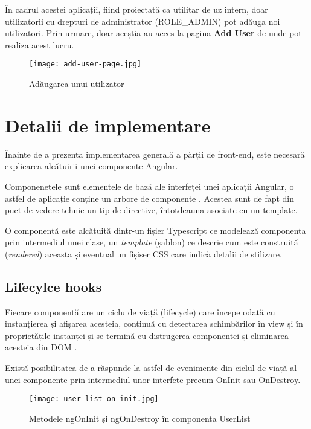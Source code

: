 În cadrul acestei aplicații, fiind proiectată ca utilitar de uz intern, doar utilizatorii cu drepturi de administrator (ROLE\_ADMIN) pot adăuga noi utilizatori. Prin urmare, doar aceștia au acces la pagina \textbf{Add User} de unde pot realiza acest lucru.

\begin{figure}[H]
	\centering
	\texttt{[image: add-user-page.jpg]}
	\caption{Adăugarea unui utilizator}
\end{figure}

\section{Detalii de implementare}

Înainte de a prezenta implementarea generală a părții de front-end, este necesară explicarea alcătuirii unei componente Angular.

Componenetele sunt elementele de bază ale interfeței unei aplicații Angular, o astfel de aplicație conține un arbore de componente \cite{component1}. Acestea sunt de fapt din puct de vedere tehnic un tip de directive, întotdeauna asociate cu un template.

O componentă este alcătuită dintr-un fișier Typescript ce modelează componenta prin intermediul unei clase, un \textit{template} (șablon) ce descrie cum este construită (\textit{rendered}) aceasta și eventual un fișiser CSS care indică detalii de stilizare.

\subsection{Lifecylce hooks}

Fiecare componentă are un ciclu de viață (lifecycle) care începe odată cu instanțierea și afișarea acesteia, continuă cu detectarea schimbărilor în view și în proprietățile instanței și se termină cu distrugerea componentei și eliminarea acesteia din DOM \cite{angular-lifecycle}.

Există posibilitatea de a răspunde la astfel de evenimente din ciclul de viață al unei componente prin intermediul unor interfețe precum OnInit sau OnDestroy.

\begin{figure}[H]
	\centering
	\texttt{[image: user-list-on-init.jpg]}
	\caption{Metodele ngOnInit și ngOnDestroy în componenta UserList}
\end{figure}


